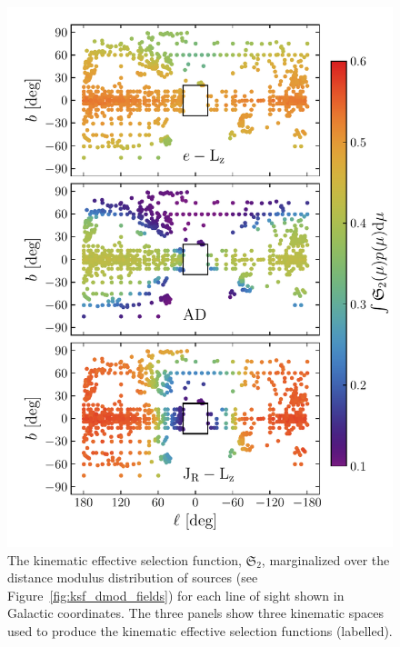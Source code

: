 \begin{figure}
    \centering
    \includegraphics[width=\halftextwidth]{figure/ch3/ksf_lb_dmod_marginalized.pdf}
    \caption{The kinematic effective selection function, $\mathfrak{S}_\mathrm{2}$, marginalized over the distance modulus distribution of sources (see Figure~\ref{fig:ksf_dmod_fields}) for each line of sight shown in Galactic coordinates. The three panels show three kinematic spaces used to produce the kinematic effective selection functions (labelled).}
    \label{fig:ksf_lb_dmod_marginalized}
\end{figure}

